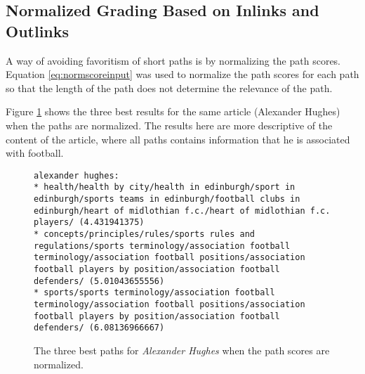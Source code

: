 \subsection{Normalized Grading Based on Inlinks and Outlinks}
\label{sec:normalized_grading_based_on_inlinks_and_outlinks}
A way of avoiding favoritism of short paths is by normalizing the path scores. 
Equation \ref{eq:normscoreinput} was used to normalize the path scores for each path so that the length of the path does not determine the relevance of the path. 


Figure \ref{fig:norm_alexander_hughes} shows the three best results for the same article (Alexander Hughes) when the paths are normalized. The results here are more descriptive of the content of the article, where all paths contains information that he is associated with football. 

\begin{figure}[h]
\centering
\begin{lstlisting}
alexander hughes:
* health/health by city/health in edinburgh/sport in edinburgh/sports teams in edinburgh/football clubs in edinburgh/heart of midlothian f.c./heart of midlothian f.c. players/ (4.431941375)
* concepts/principles/rules/sports rules and regulations/sports terminology/association football terminology/association football positions/association football players by position/association football defenders/ (5.01043655556)
* sports/sports terminology/association football terminology/association football positions/association football players by position/association football defenders/ (6.08136966667)
\end{lstlisting}
\caption[Example of normalized scores on paths]{The three best paths for \emph{Alexander Hughes} when the path scores are normalized. }
\label{fig:norm_alexander_hughes}
\end{figure}


